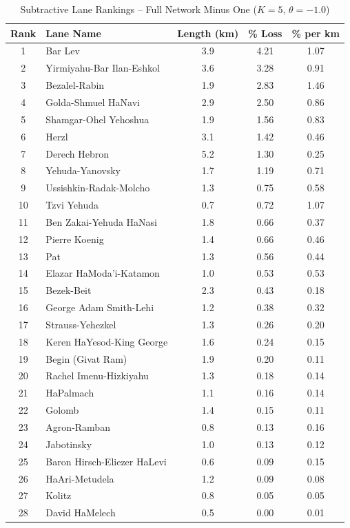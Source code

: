 \begin{table}[H]
\centering
\caption{Subtractive Lane Rankings -- Full Network Minus One ($K=5$, $\theta=-1.0$)}
\label{tab:subtractive_rankings}
\small
\begin{tabular}{@{}clccc@{}}
\toprule
\textbf{Rank} & \textbf{Lane Name} & \textbf{Length (km)} & \textbf{\% Loss} & \textbf{\% per km} \\
\midrule
1 & Bar Lev & 3.9 & 4.21 & 1.07 \\
2 & Yirmiyahu-Bar Ilan-Eshkol & 3.6 & 3.28 & 0.91 \\
3 & Bezalel-Rabin & 1.9 & 2.83 & 1.46 \\
4 & Golda-Shmuel HaNavi & 2.9 & 2.50 & 0.86 \\
5 & Shamgar-Ohel Yehoshua & 1.9 & 1.56 & 0.83 \\
6 & Herzl & 3.1 & 1.42 & 0.46 \\
7 & Derech Hebron & 5.2 & 1.30 & 0.25 \\
8 & Yehuda-Yanovsky & 1.7 & 1.19 & 0.71 \\
9 & Ussishkin-Radak-Molcho & 1.3 & 0.75 & 0.58 \\
10 & Tzvi Yehuda & 0.7 & 0.72 & 1.07 \\
11 & Ben Zakai-Yehuda HaNasi & 1.8 & 0.66 & 0.37 \\
12 & Pierre Koenig & 1.4 & 0.66 & 0.46 \\
13 & Pat & 1.3 & 0.56 & 0.44 \\
14 & Elazar HaModa'i-Katamon & 1.0 & 0.53 & 0.53 \\
15 & Bezek-Beit & 2.3 & 0.43 & 0.18 \\
16 & George Adam Smith-Lehi & 1.2 & 0.38 & 0.32 \\
17 & Strauss-Yehezkel & 1.3 & 0.26 & 0.20 \\
18 & Keren HaYesod-King George & 1.6 & 0.24 & 0.15 \\
19 & Begin (Givat Ram) & 1.9 & 0.20 & 0.11 \\
20 & Rachel Imenu-Hizkiyahu & 1.3 & 0.18 & 0.14 \\
21 & HaPalmach & 1.1 & 0.16 & 0.14 \\
22 & Golomb & 1.4 & 0.15 & 0.11 \\
23 & Agron-Ramban & 0.8 & 0.13 & 0.16 \\
24 & Jabotinsky & 1.0 & 0.13 & 0.12 \\
25 & Baron Hirsch-Eliezer HaLevi & 0.6 & 0.09 & 0.15 \\
26 & HaAri-Metudela & 1.2 & 0.09 & 0.08 \\
27 & Kolitz & 0.8 & 0.05 & 0.05 \\
28 & David HaMelech & 0.5 & 0.00 & 0.01 \\
\bottomrule
\end{tabular}
\end{table}

